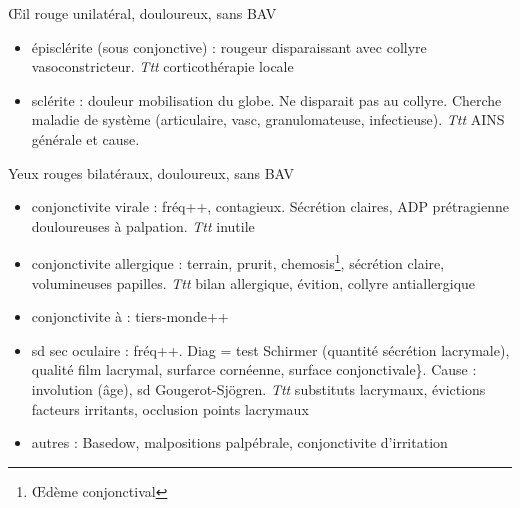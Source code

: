 \documentclass[11pt]{article}
\begin{document}
\OE{}il rouge unilatéral, douloureux, sans BAV
\begin{itemize}
\item épisclérite (sous conjonctive) : rougeur disparaissant avec collyre
vasoconstricteur. \emph{Ttt} corticothérapie locale
\item sclérite : douleur \inc mobilisation du globe. Ne disparait pas au
collyre. Cherche maladie de système (articulaire, vasc, granulomateuse,
infectieuse). \emph{Ttt} AINS générale et cause.
\end{itemize}

Yeux rouges bilatéraux, douloureux, sans BAV
\begin{itemize}
\item conjonctivite virale : fréq++, contagieux. Sécrétion claires, ADP prétragienne
douloureuses à palpation. \emph{Ttt} inutile
\item conjonctivite allergique : terrain, prurit, chemosis\footnote{\OE{}dème conjonctival}, sécrétion claire,
volumineuses papilles. \emph{Ttt} bilan allergique, évition, collyre antiallergique
\item conjonctivite à  : tiers-monde++
\item sd sec oculaire : fréq++. Diag = test Schirmer (quantité sécrétion lacrymale),
qualité film lacrymal, surfarce cornéenne, surface conjonctivale\}. Cause :
involution (âge), sd Gougerot-Sjögren. \emph{Ttt} substituts lacrymaux, évictions
facteurs irritants, occlusion points lacrymaux
\item autres : Basedow, malpositions palpébrale, conjonctivite d'irritation
\end{itemize}
\end{document}
